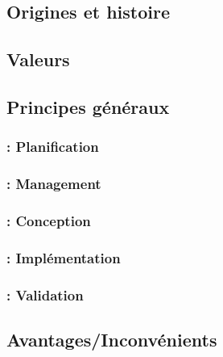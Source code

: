 \begin{frame}
\tableofcontents

\end{frame}
    
\subsection{Origines et histoire}
\begin{frame}
\frametitle{\insertsubsection}
\end{frame}

\subsection{Valeurs}
\begin{frame}
\frametitle{\insertsubsection}
\end{frame}

\subsection{Principes généraux}
\begin{frame}
\frametitle{\insertsubsection : Planification}

\end{frame}

\begin{frame}
\frametitle{\insertsubsection : Management}

\end{frame}

\begin{frame}
\frametitle{\insertsubsection : Conception}

\end{frame}

\begin{frame}
\frametitle{\insertsubsection : Implémentation}

\end{frame}

\begin{frame}
\frametitle{\insertsubsection : Validation}

\end{frame}

\subsection{Avantages/Inconvénients}
\begin{frame}
\frametitle{\insertsubsection}
\end{frame}